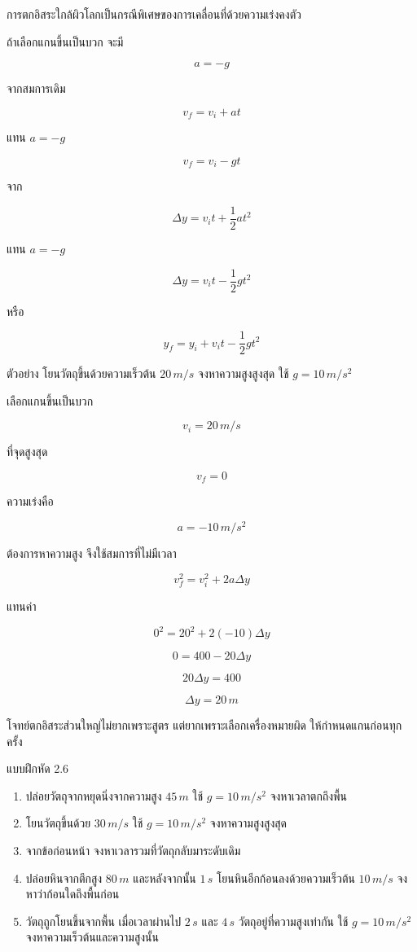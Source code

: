 การตกอิสระใกล้ผิวโลกเป็นกรณีพิเศษของการเคลื่อนที่ด้วยความเร่งคงตัว

ถ้าเลือกแกนขึ้นเป็นบวก จะมี

\[
a=-g
\]

จากสมการเดิม

\[
v_f=v_i+at
\]

แทน $a=-g$

\[
v_f=v_i-gt
\]

จาก

\[
\Delta y=v_it+\frac{1}{2}at^2
\]

แทน $a=-g$

\[
\Delta y=v_it-\frac{1}{2}gt^2
\]

หรือ

\[
y_f=y_i+v_it-\frac{1}{2}gt^2
\]

\begin{examplebox}{ตัวอย่าง}
โยนวัตถุขึ้นด้วยความเร็วต้น $20\,\si{m/s}$ จงหาความสูงสูงสุด ใช้ $g=10\,\si{m/s^2}$

เลือกแกนขึ้นเป็นบวก

\[
v_i=20\,\si{m/s}
\]

ที่จุดสูงสุด

\[
v_f=0
\]

ความเร่งคือ

\[
a=-10\,\si{m/s^2}
\]

ต้องการหาความสูง จึงใช้สมการที่ไม่มีเวลา

\[
v_f^2=v_i^2+2a\Delta y
\]

แทนค่า

\[
0^2=20^2+2(-10)\Delta y
\]

\[
0=400-20\Delta y
\]

\[
20\Delta y=400
\]

\[
\Delta y=20\,\si{m}
\]
\end{examplebox}

\begin{tcolorbox}[title=ข้อควรจำ]
โจทย์ตกอิสระส่วนใหญ่ไม่ยากเพราะสูตร แต่ยากเพราะเลือกเครื่องหมายผิด ให้กำหนดแกนก่อนทุกครั้ง
\end{tcolorbox}

\begin{exercisebox}{แบบฝึกหัด 2.6}
\begin{enumerate}
    \item ปล่อยวัตถุจากหยุดนิ่งจากความสูง $45\,\si{m}$ ใช้ $g=10\,\si{m/s^2}$ จงหาเวลาตกถึงพื้น
    \item โยนวัตถุขึ้นด้วย $30\,\si{m/s}$ ใช้ $g=10\,\si{m/s^2}$ จงหาความสูงสูงสุด
    \item จากข้อก่อนหน้า จงหาเวลารวมที่วัตถุกลับมาระดับเดิม
    \item ปล่อยหินจากตึกสูง $80\,\si{m}$ และหลังจากนั้น $1\,\si{s}$ โยนหินอีกก้อนลงด้วยความเร็วต้น $10\,\si{m/s}$ จงหาว่าก้อนใดถึงพื้นก่อน
    \item วัตถุถูกโยนขึ้นจากพื้น เมื่อเวลาผ่านไป $2\,\si{s}$ และ $4\,\si{s}$ วัตถุอยู่ที่ความสูงเท่ากัน ใช้ $g=10\,\si{m/s^2}$ จงหาความเร็วต้นและความสูงนั้น
\end{enumerate}
\end{exercisebox}

